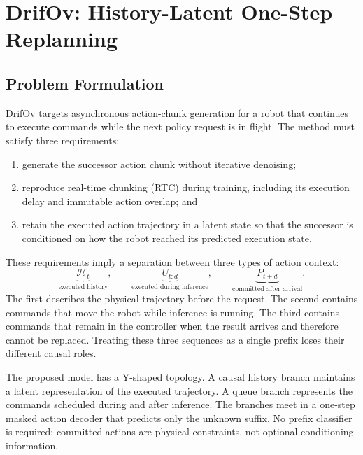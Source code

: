 
\section{DrifOv: History-Latent One-Step Replanning}
\label{sec:drifov_method}

\subsection{Problem Formulation}

DrifOv targets asynchronous action-chunk generation for a robot that continues
to execute commands while the next policy request is in flight.  The method
must satisfy three requirements:
\begin{enumerate}
    \item generate the successor action chunk without iterative denoising;
    \item reproduce real-time chunking (RTC) during training, including its
          execution delay and immutable action overlap; and
    \item retain the executed action trajectory in a latent state so that the
          successor is conditioned on how the robot reached its predicted
          execution state.
\end{enumerate}

These requirements imply a separation between three types of action context:
\begin{equation}
    \underbrace{\mathcal{H}_t}_{\text{executed history}},
    \qquad
    \underbrace{U_{t:d}}_{\text{executed during inference}},
    \qquad
    \underbrace{P_{t+d}}_{\text{committed after arrival}}.
    \label{eq:three_action_contexts}
\end{equation}
The first describes the physical trajectory before the request.  The second
contains commands that move the robot while inference is running.  The third
contains commands that remain in the controller when the result arrives and
therefore cannot be replaced.  Treating these three sequences as a single
prefix loses their different causal roles.

The proposed model has a Y-shaped topology.  A causal history branch maintains
a latent representation of the executed trajectory.  A queue branch represents
the commands scheduled during and after inference.  The branches meet in a
one-step masked action decoder that predicts only the unknown suffix.  No
prefix classifier is required: committed actions are physical constraints, not
optional conditioning information.

